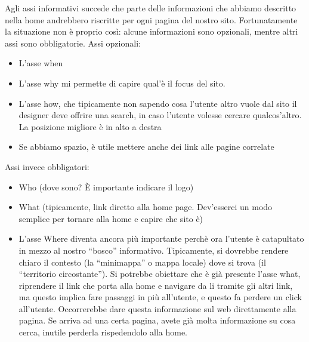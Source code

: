 Agli assi informativi succede che parte delle informazioni che abbiamo descritto nella home andrebbero riscritte per ogni pagina del nostro sito. Fortunatamente la situazione non \`e proprio cos\`i: alcune informazioni sono opzionali, mentre altri assi sono obbligatorie. Assi opzionali:
\begin{itemize}

\item L'asse when

\item L'asse why mi permette di capire qual'\`e il focus del sito.

\item L'asse how, che tipicamente non sapendo cosa l'utente altro vuole dal sito il designer deve offrire una search, in caso l'utente volesse cercare qualcos'altro. La posizione migliore \`e in alto a destra

\item Se abbiamo spazio, \`e utile mettere anche dei link alle pagine correlate

\end{itemize}

Assi invece obbligatori:

\begin{itemize}

\item Who (dove sono? \`E importante indicare il logo)

\item What (tipicamente, link diretto alla home page. Dev'esserci un modo semplice per tornare alla home e capire che sito \`e)

\item L'asse Where diventa ancora pi\`u importante perch\`e ora l'utente \`e catapultato in mezzo al nostro ``bosco'' informativo. Tipicamente, si dovrebbe rendere chiaro il contesto (la ``minimappa'' o mappa locale) dove si trova (il ``territorio circostante''). Si potrebbe obiettare che \`e gi\`a presente l'asse what, riprendere il link che porta alla home e navigare da li tramite gli altri link, ma questo implica fare passaggi in pi\`u all'utente, e questo fa perdere un click all'utente. Occorrerebbe dare questa informazione sul web direttamente alla pagina. Se arriva ad una certa pagina, avete gi\`a molta informazione su cosa cerca, inutile perderla rispedendolo alla home.

\end{itemize}

